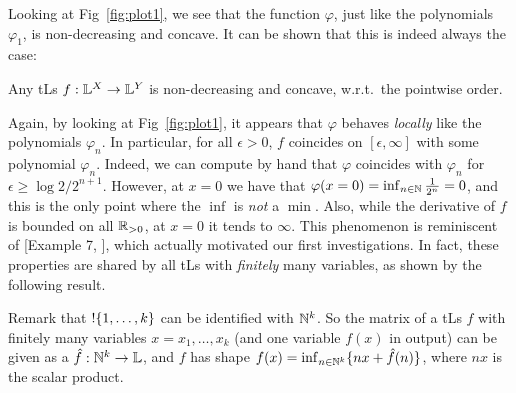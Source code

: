 % 

Looking at Fig~\ref{fig:plot1}, we see that the function $\varphi$, just like the polynomials $\varphi_{1}$, is non-decreasing and concave.
It can be shown that this is indeed always the case:

\begin{proposition}\label{prop:nondecr+conc}
 Any tLs $f:\mathbb{L}^X\to\mathbb{L}^Y$ is non-decreasing and concave, w.r.t.\ the pointwise order.
\end{proposition}

Again, by looking at Fig~\ref{fig:plot1}, it appears that $\varphi$ behaves \emph{locally} like the polynomials $\varphi_{n}$. In particular, for all $\epsilon >0$, $f$ coincides on $[\epsilon,\infty]$ with some polynomial $\varphi_{n}$. Indeed, we can compute  by hand that $\varphi$ coincides with $\varphi_{n}$ 
for $\epsilon \geq \log2/2^{n+1}$.
However, at
%
 $x=0$ we have that $\varphi(x=0)=\inf_{n\in\mathbb{N}} \frac{1}{2^n}=0$, and this is the only point where the $\inf$ is \emph{not} a $\min$.
Also, while the derivative of $f$ is bounded on all $\mathbb{R}_{>0}$, at $x=0$ it tends to $\infty$.
This phenomenon is reminiscent of [Example 7, \cite{Ehrhard2005}],
which actually motivated our first investigations.
In fact, these properties are shared by all tLs with \emph{finitely} many variables, as shown by the following result.


Remark that $!\{1,\dots,k\}$ can be identified with $\mathbb{N}^k$.
So the matrix of a tLs $f$ with finitely many variables $x=x_1,\dots,x_k$ (and one variable $f(x)$ in output) can be given as a $\hat{f}:\mathbb{N}^k\to\mathbb{L}$, and $f$ has shape $f(x)=\inf_{n\in \mathbb{N}^k}\{nx+\hat{f}(n)\}$, where $nx$ is the scalar product.

